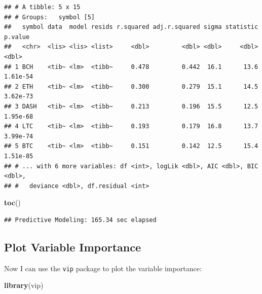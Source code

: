 \documentclass[
]{book}
\newenvironment{Shaded}{\begin{snugshade}}{\end{snugshade}}
\newcommand{\ControlFlowTok}[1]{\textcolor[rgb]{0.13,0.29,0.53}{\textbf{#1}}}
\newcommand{\DecValTok}[1]{\textcolor[rgb]{0.00,0.00,0.81}{#1}}
\newcommand{\KeywordTok}[1]{\textcolor[rgb]{0.13,0.29,0.53}{\textbf{#1}}}
\newcommand{\NormalTok}[1]{#1}
\newcommand{\OperatorTok}[1]{\textcolor[rgb]{0.81,0.36,0.00}{\textbf{#1}}}
\newcommand{\StringTok}[1]{\textcolor[rgb]{0.31,0.60,0.02}{#1}}
\begin{document}
\begin{verbatim}
## # A tibble: 5 x 15
## # Groups:   symbol [5]
##   symbol data  model resids r.squared adj.r.squared sigma statistic  p.value
##   <chr>  <lis> <lis> <list>     <dbl>         <dbl> <dbl>     <dbl>    <dbl>
## 1 BCH    <tib~ <lm>  <tibb~     0.478         0.442  16.1      13.6 1.61e-54
## 2 ETH    <tib~ <lm>  <tibb~     0.300         0.279  15.1      14.5 3.62e-73
## 3 DASH   <tib~ <lm>  <tibb~     0.213         0.196  15.5      12.5 1.95e-68
## 4 LTC    <tib~ <lm>  <tibb~     0.193         0.179  16.8      13.7 3.99e-74
## 5 BTC    <tib~ <lm>  <tibb~     0.151         0.142  12.5      15.4 1.51e-85
## # ... with 6 more variables: df <int>, logLik <dbl>, AIC <dbl>, BIC <dbl>,
## #   deviance <dbl>, df.residual <int>
\end{verbatim}

\begin{Shaded}
\begin{Highlighting}[]
\KeywordTok{toc}\NormalTok{()}
\end{Highlighting}
\end{Shaded}

\begin{verbatim}
## Predictive Modeling: 165.34 sec elapsed
\end{verbatim}

\hypertarget{plot-variable-importance}{%
\subsection{Plot Variable Importance}\label{plot-variable-importance}}

Now I can use the \texttt{vip} \citep{R-vip} package to plot the variable importance:

\begin{Shaded}
\begin{Highlighting}[]
\KeywordTok{library}\NormalTok{(vip)}
\end{Highlighting}
\end{Shaded}

\begin{Shaded}
\end{Shaded}
\end{document}
